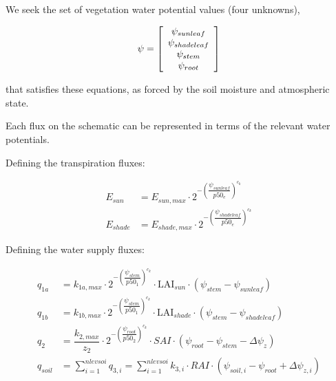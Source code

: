 \documentclass[draft,linenumbers]{agujournal}
\begin{document}
We seek the set of vegetation water potential values (four unknowns), 

   \begin{linenomath*} \begin{equation}
   \psi=\left[ \begin {array}{c} 
   \psi_{sunleaf}\cr\psi_{shadeleaf}\cr\psi_{stem}\cr\psi_{root}
   \end {array} \right] 
   \end{equation} \end{linenomath*}

that satisfies these equations, as forced by the soil moisture and atmospheric state. 

Each flux on the schematic can be represented in terms of the relevant water potentials. 

Defining the transpiration fluxes:


   \begin{linenomath*} \begin{equation}
   \begin{aligned}
   E_{sun} &= E_{sun,max} \cdot 2^{-\left(\dfrac{\psi_{sunleaf}}{p50_e}\right)^{c_k}} \\
   E_{shade} &= E_{shade,max} \cdot 2^{-\left(\dfrac{\psi_{shadeleaf}}{p50_e}\right)^{c_k}} 
   \end{aligned}
   \end{equation} \end{linenomath*}

Defining the water supply fluxes:

   \begin{linenomath*} \begin{equation}
   \begin{aligned}
   q_{1a}&=k_{1a,max}\cdot 2^{-\left(\dfrac{\psi_{stem}}{p50_1}\right)^{c_k}} \cdot\mbox{LAI}_{sun}\cdot\left(\psi_{stem}-\psi_{sunleaf} \right) \\
   q_{1b}&=k_{1b,max}\cdot 2^{-\left(\dfrac{\psi_{stem}}{p50_1}\right)^{c_k}}\cdot\mbox{LAI}_{shade}\cdot\left(\psi_{stem}-\psi_{shadeleaf} \right) \\
   q_2&=\dfrac{k_{2,max}}{z_2} \cdot 2^{-\left(\dfrac{\psi_{root}}{p50_2}\right)^{c_k}} \cdot SAI \cdot \left( \psi_{root} - \psi_{stem} - \Delta \psi_z  \right) \\
   q_{soil}&=\sum_{i=1}^{nlevsoi}{q_{3,i}}=\sum_{i=1}^{nlevsoi}{k_{3,i}\cdot RAI\cdot\left(\psi_{soil,i}-\psi_{root} + \Delta\psi_{z,i} \right)}
   \end{aligned}
   \end{equation} \end{linenomath*}
\end{document}
